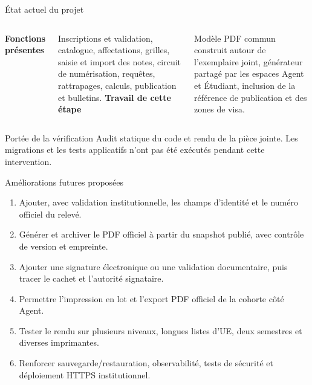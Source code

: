 \documentclass[aspectratio=169,12pt]{beamer}
\begin{document}
\begin{frame}{État actuel du projet}
  \begin{columns}[T,onlytextwidth]
      \textbf{Fonctions présentes}\par\smallskip
      Inscriptions et validation, catalogue, affectations, grilles, saisie et import des notes, circuit de numérisation, requêtes, rattrapages, calculs, publication et bulletins.
      \textbf{Travail de cette étape}\par\smallskip
      Modèle PDF commun construit autour de l’exemplaire joint, générateur partagé par les espaces Agent et Étudiant, inclusion de la référence de publication et des zones de visa.
  \end{columns}
  \vspace{1em}
  \begin{block}{Portée de la vérification}
    Audit statique du code et rendu de la pièce jointe. Les migrations et les tests applicatifs n’ont pas été exécutés pendant cette intervention.
  \end{block}
\end{frame}

\begin{frame}{Améliorations futures proposées}
  \begin{enumerate}
    \item Ajouter, avec validation institutionnelle, les champs d’identité et le numéro officiel du relevé.
    \item Générer et archiver le PDF officiel à partir du snapshot publié, avec contrôle de version et empreinte.
    \item Ajouter une signature électronique ou une validation documentaire, puis tracer le cachet et l’autorité signataire.
    \item Permettre l’impression en lot et l’export PDF officiel de la cohorte côté Agent.
    \item Tester le rendu sur plusieurs niveaux, longues listes d’UE, deux semestres et diverses imprimantes.
    \item Renforcer sauvegarde/restauration, observabilité, tests de sécurité et déploiement HTTPS institutionnel.
  \end{enumerate}
\end{frame}
\end{document}
